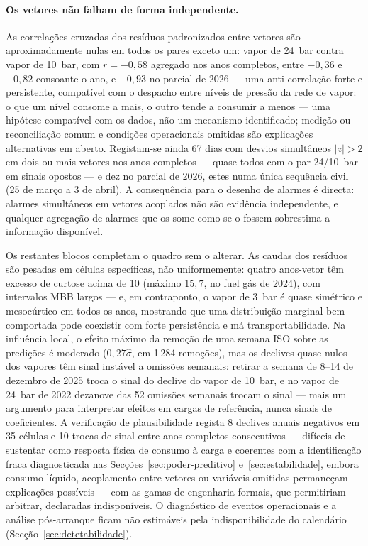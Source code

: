 \paragraph{Os vetores não falham de forma independente.} As correlações
cruzadas dos resíduos padronizados entre vetores são aproximadamente nulas
em todos os pares exceto um: vapor de 24~bar contra vapor de 10~bar, com
$r = -0{,}58$ agregado nos anos completos, entre $-0{,}36$ e $-0{,}82$
consoante o ano, e $-0{,}93$ no parcial de 2026 --- uma anti-correlação forte
e persistente, compatível com o despacho entre níveis de pressão da rede de
vapor: o que um nível consome a mais, o outro tende a consumir a menos ---
uma hipótese compatível com os dados, não um mecanismo identificado; medição
ou reconciliação comum e condições operacionais omitidas são explicações
alternativas em aberto. Registam-se ainda 67 dias com desvios simultâneos
$|z| > 2$ em dois ou mais vetores nos anos completos --- quase todos com o
par 24/10~bar em sinais opostos --- e dez no parcial de 2026, estes numa
única sequência civil (25 de março a 3 de abril). A consequência para o
desenho de alarmes é directa: alarmes
simultâneos em vetores acoplados não são evidência independente, e qualquer
agregação de alarmes que os some como se o fossem sobrestima a informação
disponível.

Os restantes blocos completam o quadro sem o alterar. As caudas dos resíduos
são pesadas em células específicas, não uniformemente: quatro anos-vetor têm
excesso de curtose acima de 10 (máximo $15{,}7$, no fuel gás de 2024), com
intervalos MBB largos --- e, em contraponto, o vapor de 3~bar é quase
simétrico e mesocúrtico em todos os anos, mostrando que uma distribuição
marginal bem-comportada pode coexistir com forte persistência e má
transportabilidade. Na influência local, o efeito máximo da remoção de uma
semana ISO sobre as predições é moderado ($0{,}27\hat\sigma$, em 1\,284
remoções), mas os declives quase nulos dos vapores têm sinal instável a
omissões semanais: retirar a semana de 8--14 de dezembro de 2025 troca o
sinal do declive do vapor de 10~bar, e no vapor de 24~bar de 2022 dezanove
das 52 omissões semanais trocam o sinal --- mais um argumento para
interpretar efeitos em cargas de referência, nunca sinais de coeficientes. A
verificação de plausibilidade regista 8 declives anuais negativos em 35
células e 10 trocas de sinal entre anos completos consecutivos ---
difíceis de sustentar como resposta física de consumo à carga e coerentes com
a identificação fraca diagnosticada nas Secções~\ref{sec:poder-preditivo} e~\ref{sec:estabilidade}, embora consumo líquido,
acoplamento entre vetores ou variáveis omitidas permaneçam explicações
possíveis --- com as gamas de engenharia formais, que permitiriam arbitrar,
declaradas indisponíveis. O diagnóstico de eventos operacionais e a
análise pós-arranque ficam não estimáveis pela indisponibilidade do
calendário (Secção~\ref{sec:detetabilidade}).



